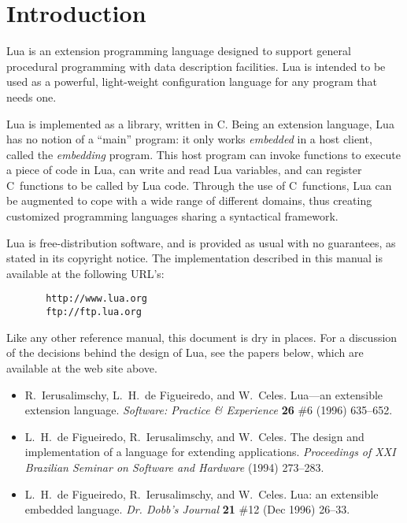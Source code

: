 \documentclass[11pt]{article}
\begin{document}
\newpage
\null
\newpage
\tableofcontents

\newpage
\setcounter{page}{1}
\pagestyle{plain}


\section{Introduction}

Lua is an extension programming language designed to support
general procedural programming with data description
facilities.
Lua is intended to be used as a powerful, light-weight
configuration language for any program that needs one.

Lua is implemented as a library, written in C.
Being an extension language, Lua has no notion of a ``main'' program:
it only works \emph{embedded} in a host client,
called the \emph{embedding} program.
This host program can invoke functions to execute a piece of
code in Lua, can write and read Lua variables,
and can register C~functions to be called by Lua code.
Through the use of C~functions, Lua can be augmented to cope with
a wide range of different domains,
thus creating customized programming languages sharing a syntactical framework.

Lua is free-distribution software,
and is provided as usual with no guarantees,
as stated in its copyright notice.
The implementation described in this manual is available
at the following URL's:
\begin{verbatim}
       http://www.lua.org
       ftp://ftp.lua.org
\end{verbatim}

Like any other reference manual,
this document is dry in places.
For a discussion of the decisions behind the design of Lua,
see the papers below,
which are available at the web site above.
\begin{itemize}
\item
R.~Ierusalimschy, L.~H.~de Figueiredo, and W.~Celes.
Lua---an extensible extension language.
\emph{Software: Practice \& Experience} {\bf 26} \#6 (1996) 635--652.
\item
L.~H.~de Figueiredo, R.~Ierusalimschy, and W.~Celes.
The design and implementation of a language for extending applications.
\emph{Proceedings of XXI Brazilian Seminar on Software and Hardware} (1994) 273--283.
\item
L.~H.~de Figueiredo, R.~Ierusalimschy, and W.~Celes.
Lua: an extensible embedded language.
\emph{Dr. Dobb's Journal} {\bf  21} \#12 (Dec 1996) 26--33.
\end{itemize}
\end{document}

